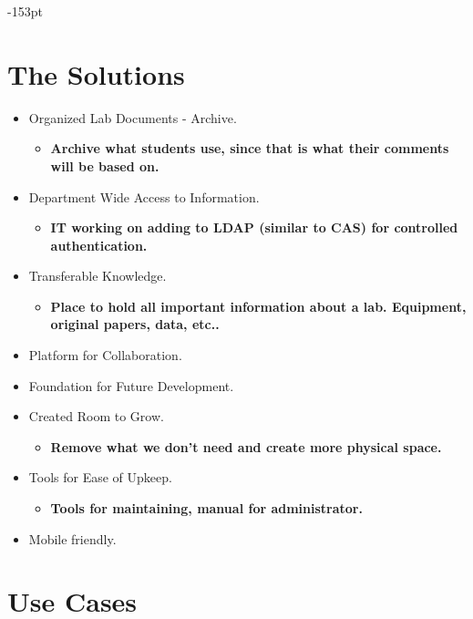 \begin{adjustwidth}{}{-153pt}
\section{\bf The Solutions}
\begin{itemize}
	\item Organized Lab Documents - Archive.
		\begin{itemize} \item {\bf Archive what students use, since that is what their comments 				will be 	based on.} \end{itemize}
	\item Department Wide Access to Information.
		\begin{itemize} \item {\bf IT working on adding to LDAP (similar to CAS) for controlled 				authentication.} \end{itemize}
	\item Transferable Knowledge.
		\begin{itemize} \item {\bf Place to hold all important information about a lab. Equipment, 			original papers, data, etc..} \end{itemize}
	\item Platform for Collaboration.
	\item Foundation for Future Development.
	\item Created Room to Grow.
		\begin{itemize} \item {\bf Remove what we don't need and create more physical space.}					\end{itemize}
	\item Tools for Ease of Upkeep.
		\begin{itemize} \item {\bf Tools for maintaining, manual for administrator.}\end{itemize}
	\item Mobile friendly.
\end{itemize}

\section{\bf Use Cases}


\end{adjustwidth}
